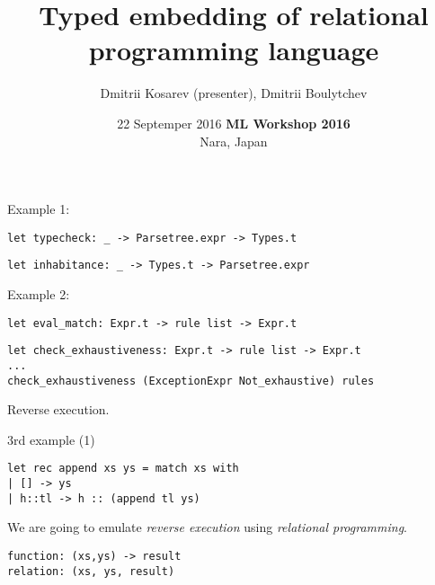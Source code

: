 \documentclass [mathserif]{beamer}
\title{Typed embedding of relational programming language}
\author[Dmitrii Kosarev, Dmitrii Boulytchev]{Dmitrii Kosarev  (presenter), Dmitrii Boulytchev}
\date{22 Septemper 2016}
\date{
   \textbf{ML Workshop 2016}\\
   \small{%
   Nara, Japan}
}
\institute[]{
\textbf{Saint-Petersburg State University} \\
\texttt{Dmitrii.Kosarev@protonmail.ch}
}
\theoremstyle{definition}
\begin{document}
\begin{frame} 
  \titlepage
\end{frame}

\begin{frame}[fragile]{}
Example 1:
\begin{lstlisting}
let typecheck: _ -> Parsetree.expr -> Types.t
\end{lstlisting}
\pause

\begin{lstlisting}
let inhabitance: _ -> Types.t -> Parsetree.expr 
\end{lstlisting}
\pause

Example 2:
\begin{lstlisting}
let eval_match: Expr.t -> rule list -> Expr.t
\end{lstlisting}
\pause

\begin{lstlisting}
let check_exhaustiveness: Expr.t -> rule list -> Expr.t 
...
check_exhaustiveness (ExceptionExpr Not_exhaustive) rules
\end{lstlisting}
\pause

Reverse execution.
\end{frame}

\begin{frame}[fragile]{3rd example (1)}
\begin{lstlisting}
let rec append xs ys = match xs with
| [] -> ys
| h::tl -> h :: (append tl ys)
\end{lstlisting}

\pause
We are going to emulate \textit{ reverse execution} using \textit{relational programming}.

\begin{verbatim}
function: (xs,ys) -> result
relation: (xs, ys, result)
\end{verbatim}

\end{frame}
\end{document}
